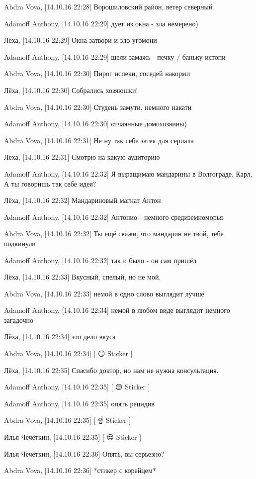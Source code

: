 Abdra Vova, [14.10.16 22:28]
Ворошиловский район, ветер северный

Adamoff Anthony, [14.10.16 22:29]
дует из окна - зла немерено)

Лёха, [14.10.16 22:29]
Окна затвори и зло угомони

Adamoff Anthony, [14.10.16 22:29]
щели замажь - печку / баньку истопи

Abdra Vova, [14.10.16 22:30]
Пирог испеки, соседей накорми

Лёха, [14.10.16 22:30]
Собрались хозяюшки!

Abdra Vova, [14.10.16 22:30]
Студень замути, немного накати

Adamoff Anthony, [14.10.16 22:30]
отчаянные домохозяины)

Abdra Vova, [14.10.16 22:31]
Не ну так себе затея для сериала

Лёха, [14.10.16 22:31]
Смотрю на какую аудиторию

Adamoff Anthony, [14.10.16 22:32]
Я выращимаю мандарины в Волгограде, Карл, А ты говоришь так себе идея?

Лёха, [14.10.16 22:32]
Мандариновый магнат Антон

Adamoff Anthony, [14.10.16 22:32]
Антонио - немного средиземноморья

Abdra Vova, [14.10.16 22:32]
Ты ещё скажи, что мандарин не твой, тебе подкинули

Adamoff Anthony, [14.10.16 22:32]
так и было - он сам пришёл

Лёха, [14.10.16 22:33]
Вкусный, спелый, но не мой.

Abdra Vova, [14.10.16 22:33]
немой в одно слово выглядит лучше

Adamoff Anthony, [14.10.16 22:34]
немой в любом виде выглядит немного загадочно

Лёха, [14.10.16 22:34]
это дело вкуса

Abdra Vova, [14.10.16 22:34]
[ 😏 Sticker ]

Лёха, [14.10.16 22:35]
Спасибо доктор, но нам не нужна консультация.

Adamoff Anthony, [14.10.16 22:35]
[ 😔 Sticker ]

Adamoff Anthony, [14.10.16 22:35]
опять рецидив

Abdra Vova, [14.10.16 22:35]
[ ☝️ Sticker ]

Илья Чечёткин, [14.10.16 22:35]
[ 😑 Sticker ]

Илья Чечёткин, [14.10.16 22:36]
Опять, вы серьезно?

Abdra Vova, [14.10.16 22:36]
*стикер с корейцем*

